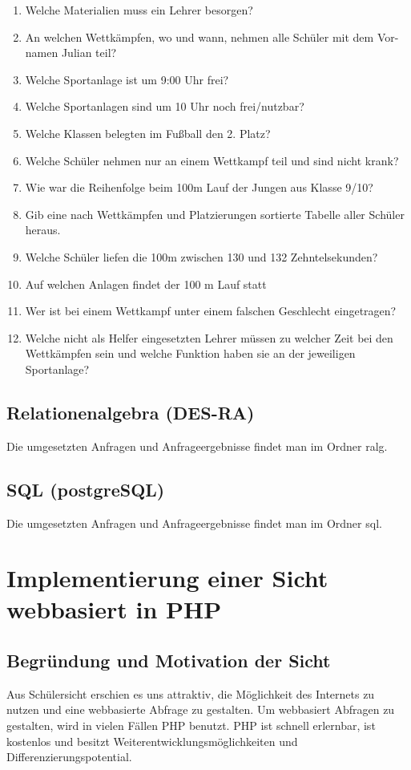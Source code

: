 \documentclass[pagesize,11pt,twoside]{scrartcl}
\begin{document}
\begin{enumerate}
 \item  Welche Materialien muss ein Lehrer besorgen?
 \item An welchen Wettkämpfen, wo und wann, nehmen alle Schüler mit dem Vor-
namen Julian teil?
 \item Welche Sportanlage ist um 9:00 Uhr frei?
 \item Welche Sportanlagen sind um 10 Uhr noch frei/nutzbar?
 \item Welche Klassen belegten im Fußball den 2. Platz?
 \item Welche Schüler nehmen nur an einem Wettkampf teil und sind nicht krank?
 \item Wie war die Reihenfolge beim 100m Lauf der Jungen aus Klasse 9/10?
 \item Gib eine nach Wettkämpfen und Platzierungen sortierte Tabelle
aller Schüler heraus.
 \item  Welche Schüler liefen die 100m zwischen 130 und 132 Zehntelsekunden?
 \item Auf  welchen Anlagen findet der 100 m Lauf statt
 \item Wer ist bei einem Wettkampf unter einem falschen Geschlecht eingetragen?
 \item Welche nicht als Helfer eingesetzten Lehrer müssen zu welcher Zeit bei den 
Wettkämpfen sein und welche Funktion haben sie an der jeweiligen 
Sportanlage?

\end{enumerate}

\subsection{Relationenalgebra (DES-RA)}
Die umgesetzten Anfragen und Anfrageergebnisse findet man im Ordner \glqq ralg\grqq.
\subsection{SQL (postgreSQL)}
Die umgesetzten Anfragen und Anfrageergebnisse findet man im Ordner \glqq sql\grqq.
\section{Implementierung einer Sicht webbasiert in PHP}
\subsection{Begründung und Motivation der Sicht}
Aus Schülersicht erschien es uns attraktiv, die Möglichkeit des Internets zu nutzen und eine webbasierte Abfrage zu gestalten.
Um webbasiert Abfragen zu gestalten, wird in vielen Fällen PHP benutzt. PHP ist schnell erlernbar, ist kostenlos und besitzt 
Weiterentwicklungsmöglichkeiten und Differenzierungspotential.\\
\end{document}
